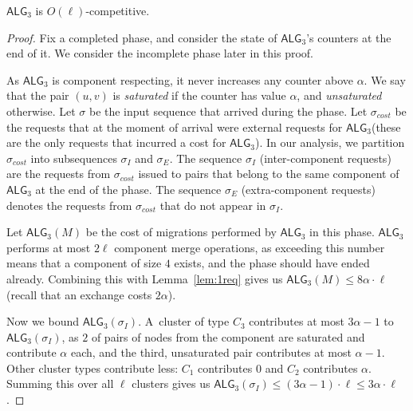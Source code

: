 \documentclass[manuscript,screen=true, review, anonymous]{acmart}
\newcommand{\TAlg}{{\ensuremath{\textsf{ALG}_{3}}}\xspace} %
\begin{document}
\begin{theorem}
  \TAlg is $O(\ell)$-competitive.
\end{theorem}
\begin{proof}
  Fix a completed phase, and consider the state of \TAlg's counters at the end of it.
  We consider the incomplete phase later in this proof.

  As \TAlg is component respecting, it never increases any counter above $\alpha$.
  We say that the pair $(u, v)$ is \emph{saturated} if the counter has value $\alpha$, and \emph{unsaturated} otherwise.
  Let $\sigma$ be the input sequence that arrived during the phase.
  Let $\sigma_{cost}$ be the requests that at the moment of arrival were external requests for \TAlg (these are the only requests that incurred a cost for \TAlg).
  In our analysis, we partition $\sigma_{cost}$ into subsequences $\sigma_I$ and $\sigma_E$.
  The sequence $\sigma_I$ (inter-component requests) are the requests from $\sigma_{cost}$ issued to pairs that belong to the same component of \TAlg at the end of the phase.
  The sequence $\sigma_E$ (extra-component requests) denotes the requests from $\sigma_{cost}$ that do not appear in $\sigma_I$.


  Let $\TAlg(M)$ be the cost of migrations performed by \TAlg in this phase.
  \TAlg performs at most $2 \ell$ component merge operations, as
  exceeding this number means that a component of size $4$ exists, and the phase should have ended already.
  Combining this with Lemma~\ref{lem:1req} gives us $\TAlg(M) \leq 8\alpha\cdot\ell$ (recall that an exchange costs $2\alpha$).
  
  Now we bound $\TAlg(\sigma_I)$.
  A~cluster of type $C_3$ contributes at most $3 \alpha - 1$ to $\TAlg(\sigma_I)$, as $2$ of pairs of nodes from the component are saturated and contribute $\alpha$ each, and the third, unsaturated pair contributes at most $\alpha-1$.
  Other cluster types contribute less: $C_1$ contributes $0$ and $C_2$ contributes $\alpha$.
  Summing this over all $\ell$ clusters gives us $\TAlg(\sigma_I) \leq (3 \alpha-1)\cdot \ell \leq 3\alpha\cdot\ell$.


\end{proof}
\end{document}
